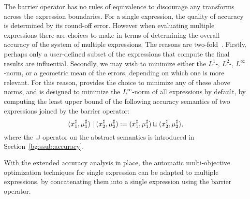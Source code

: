 The barrier operator has no rules of equivalence to discourage any transforms
across the expression boundaries.  For a single expression, the quality of
accuracy is determined by its round-off error.  However when evaluating
multiple expressions there are choices to make in terms of determining the
overall accuracy of the system of multiple expressions.  The reasons are
two-fold~\cite{martel09}.  Firstly, perhaps only a user-defined subset of the
expressions that compute the final results are influential.  Secondly, we may
wish to minimize either the $L^1$-, $L^2$-, $L^\infty$-norm, or a geometric
mean of the errors, depending on which one is more relevant.  For this reason,
\soap{} provides the choice to minimize any of these above norms, and is
designed to minimize the $L^\infty$-norm of all expressions by default, by
computing the least upper bound of the following accuracy semantics of two
expressions joined by the barrier operator:
\begin{equation}
    (x^\sharp_1, \mu^\sharp_1) \mid (x^\sharp_2, \mu^\sharp_2)
    \vcentcolon= (x^\sharp_1, \mu^\sharp_1) \sqcup (x^\sharp_2, \mu^\sharp_2),
\end{equation}
where the $\sqcup$ operator on the abstract semantics is introduced in
Section~\ref{bg:ssub:accuracy}.

With the extended accuracy analysis in place, the automatic multi-objective
optimization techniques for single expression can be adapted to multiple
expressions, by concatenating them into a single expression using the barrier
operator.
